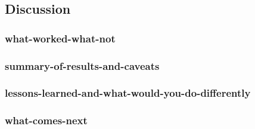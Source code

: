 \subsection{Discussion}

\subsubsection{what-worked-what-not}
\subsubsection{summary-of-results-and-caveats}
\subsubsection{lessons-learned-and-what-would-you-do-differently}
\subsubsection{what-comes-next}
